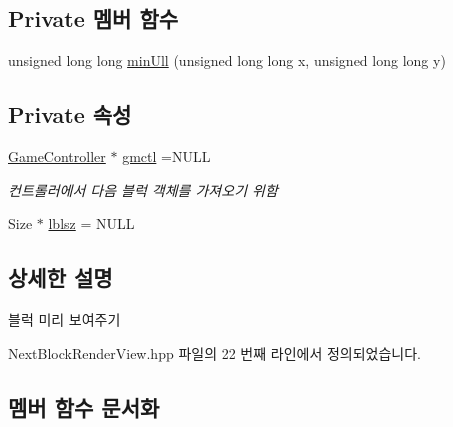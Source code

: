 \subsection*{Private 멤버 함수}
\begin{DoxyCompactItemize}
\item 
unsigned long long \hyperlink{class_tetris_1_1_views_1_1_next_block_render_behavior_affd1ea6303953e254461752d30642fcf}{min\+Ull} (unsigned long long x, unsigned long long y)
\end{DoxyCompactItemize}
\subsection*{Private 속성}
\begin{DoxyCompactItemize}
\item 
\hyperlink{class_tetris_1_1_game_controller}{Game\+Controller} $\ast$ \hyperlink{class_tetris_1_1_views_1_1_next_block_render_behavior_a63b273270f67d15da4d2c16452a0000e}{gmctl} =N\+U\+LL
\begin{DoxyCompactList}\small\item\em 컨트롤러에서 다음 블럭 객체를 가져오기 위함 \end{DoxyCompactList}\item 
Size $\ast$ \hyperlink{class_tetris_1_1_views_1_1_next_block_render_behavior_aa87ada3fdc0e7e5c3bfb98e123d9825f}{lblsz} = N\+U\+LL
\end{DoxyCompactItemize}


\subsection{상세한 설명}
블럭 미리 보여주기 

Next\+Block\+Render\+View.\+hpp 파일의 22 번째 라인에서 정의되었습니다.



\subsection{멤버 함수 문서화}
\mbox{\label{class_tetris_1_1_views_1_1_next_block_render_behavior_a5593a27688fa599f7315c48ee0a0dfb6}} 
